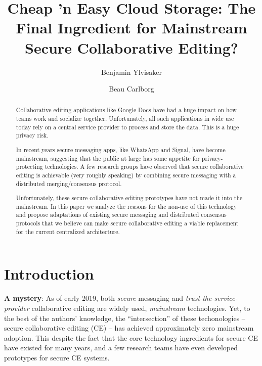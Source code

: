 \documentclass[runningheads]{llncs}
\begin{document}
\title{Cheap 'n Easy Cloud Storage: The Final Ingredient for Mainstream Secure Collaborative Editing?}

\author{Benjamin Ylvisaker \and
Beau Carlborg}


\maketitle

\begin{abstract}

Collaborative editing applications like Google Docs have had a huge impact on how teams work and socialize together.
Unfortunately, all such applications in wide use today rely on a central service provider to process and store the data.
This is a huge privacy risk.

In recent years secure messaging apps, like WhatsApp and Signal, have become mainstream, suggesting that the public at large has some appetite for privacy-protecting technologies.
A few research groups have observed that secure collaborative editing is achievable (very roughly speaking) by combining secure messaging with a distributed merging{\slash}consensus protocol.

Unfortunately, these secure collaborative editing prototypes have not made it into the mainstream.
In this paper we analyze the reasons for the non-use of this technology and propose adaptations of existing secure messaging and distributed consensus protocols that we believe can make secure collaborative editing a viable replacement for the current centralized architecture.

\end{abstract}

\section{Introduction}

\textbf{A mystery}:
As of early 2019, both \emph{secure} messaging and \emph{trust-the-service-provider} collaborative editing are widely used, \emph{mainstream} technologies.
Yet, to the best of the authors' knowledge, the ``intersection'' of these techonologies -- secure collaborative editing (CE) -- has achieved approximately zero mainstream adoption.
This despite the fact that the core technology ingredients for secure CE have existed for many years, and a few research teams have even developed prototypes for secure CE systems.
\end{document}

